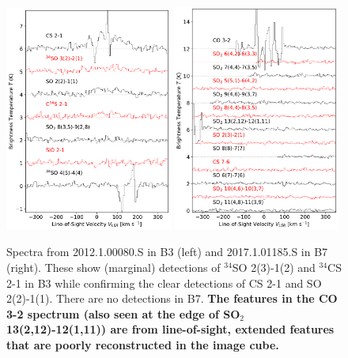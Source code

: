 \documentclass[]{aastex631}
\def\rr#1{\textbf{#1}}
\begin{document}
\begin{figure}[!ht]
    \includegraphics[width=0.49\textwidth]{figures/B3Tsuboi_spectra_overlays.pdf}
    \includegraphics[width=0.49\textwidth]{figures/B7_spectra_overlays.pdf}
    \caption{Spectra from 2012.1.00080.S in B3 (left) and 2017.1.01185.S in B7 (right).
    These show (marginal) detections of $^{34}$SO 2(3)-1(2) and $^{34}$CS 2-1 in B3 while confirming the clear detections of CS 2-1 and SO 2(2)-1(1). %
    There are no detections in B7.
    \rr{The features in the CO 3-2 spectrum (also seen at the edge of SO$_2$ 13(2,12)-12(1,11)) are from line-of-sight, extended features that are poorly reconstructed in the image cube. }
    }
    \label{fig:other_spectra}
\end{figure}
\end{document}
